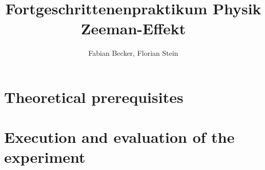 \documentclass[]{report}
\title{Fortgeschrittenenpraktikum Physik \\ Zeeman-Effekt}
\author{Fabian Becker, Florian Stein}
\numberwithin{equation}{chapter}
\begin{document}
\renewcommand{\figurename}{Fig.}
\renewcommand{\tablename}{Tab.}

\maketitle
\tableofcontents
\newpage
\chapter{Theoretical prerequisites}

\chapter{Execution and evaluation of the experiment}




\end{document}
